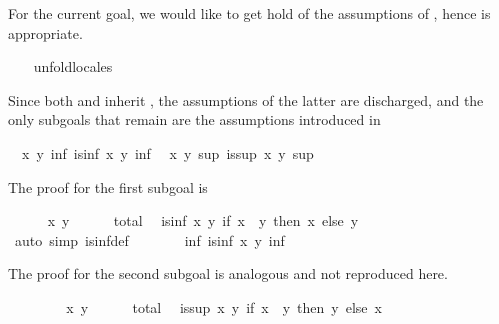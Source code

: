 \begin{isabellebody}
\begin{isamarkuptxt}
  For the current goal, we would like to get hold of
  the assumptions of , hence 
  is appropriate.%
\end{isamarkuptxt}%
\isamarkuptrue%
\ \ \isamarkupfalse%
\ unfold{\isacharunderscore}locales%
\begin{isamarkuptxt}%
Since both  and 
  inherit , the assumptions of the latter are
  discharged, and the only subgoals that remain are the assumptions
  introduced in  \begin{isabelle}%
\ {}{\isachardot}\ {\isasymAnd}x\ y{\isachardot}\ {\isasymexists}inf{\isachardot}\ is{\isacharunderscore}inf\ x\ y\ inf\isanewline
\ {}{\isachardot}\ {\isasymAnd}x\ y{\isachardot}\ {\isasymexists}sup{\isachardot}\ is{\isacharunderscore}sup\ x\ y\ sup%
\end{isabelle}
  The proof for the first subgoal is%
\end{isamarkuptxt}%
\isamarkuptrue%
\ \ \ \ \isamarkupfalse%
\ x\ y\isanewline
\ \ \ \ \isamarkupfalse%
\ total\ \isamarkupfalse%
\ {\isachardoublequoteopen}is{\isacharunderscore}inf\ x\ y\ {\isacharparenleft}if\ x\ {\isasymsqsubseteq}\ y\ then\ x\ else\ y{\isacharparenright}{\isachardoublequoteclose}\isanewline
\ \ \ \ \ \ \isamarkupfalse%
\ {\isacharparenleft}auto\ simp{\isacharcolon}\ is{\isacharunderscore}inf{\isacharunderscore}def{\isacharparenright}\isanewline
\ \ \ \ \isamarkupfalse%
\ \isamarkupfalse%
\ {\isachardoublequoteopen}{\isasymexists}inf{\isachardot}\ is{\isacharunderscore}inf\ x\ y\ inf{\isachardoublequoteclose}\ \isacommand{{\isachardot}{\isachardot}}\isamarkupfalse%
%
\begin{isamarkuptxt}%
The proof for the second subgoal is analogous and not
  reproduced here.%
\end{isamarkuptxt}%
\isamarkuptrue%
%
\endisatagvisible
{\isafoldvisible}%
%
\isadelimvisible
%
\endisadelimvisible
%
\isadeliminvisible
\ \ %
\endisadeliminvisible
%
\isataginvisible
{}\isamarkupfalse%
\isanewline
\ \ \ \ \isamarkupfalse%
\ x\ y\isanewline
\ \ \ \ \isamarkupfalse%
\ total\ \isamarkupfalse%
\ {\isachardoublequoteopen}is{\isacharunderscore}sup\ x\ y\ {\isacharparenleft}if\ x\ {\isasymsqsubseteq}\ y\ then\ y\ else\ x{\isacharparenright}{\isachardoublequoteclose}\isanewline

\end{isabellebody}
